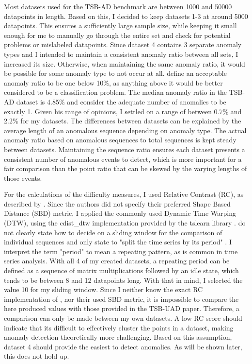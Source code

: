 \documentclass[12pt,oneside]{article}
\begin{document}
Most datasets used for the TSB-AD benchmark are between 1000 and 50000 datapoints in length. Based on this, I decided to keep datasets 1-3 at around 5000 datapoints. This ensures a sufficiently large sample size, while keeping it small enough for me to manually go through the entire set and check for potential problems or mislabeled datapoints. Since dataset 4 contains 3 separate anomaly types and I intended to maintain a consistent anomaly ratio between all sets, I increased its size. Otherwise, when maintaining the same anomaly ratio, it would be possible for some anomaly type to not occur at all. \cite[pp.~8]{SchmidlEtAl2022Anomaly} define an acceptable anomaly ratio to be one below 10\%, as anything above it would be better considered to be a classification problem. The median anomaly ratio in the TSB-AD dataset is 4.85\% and \cite[p.~4]{wu2021current} consider the adequate number of anomalies to be exactly 1. Given his range of opinions, I settled on a range of between 0.7\% and 2.2\% for my datasets. The differences between datasets can be explained by the average length of an anomalous sequence depending on anomaly type. The actual anomaly ratio based on anomalous sequences to total sequences is kept steady between datasets. Maintaining the sequence ratio ensures each dataset presents a consistent number of anomalous events to detect, which is more important for a fair comparison than the point ratio that can be skewed by the varying lengths of those events. \par
For the calculations of the difficulty measures, I used Relative Contrast (RC), as described by \cite[pp.~1704]{paparrizos2022tsb}. Since the authors did not specify their preferred Shape Based Distance (SBD) metric, I applied the commonly used Dynamic Time Warping (DTW), using the cdist\_dtw implementation provided by the tslearn library \parencites{DTW}. \cite[pp.~1704]{paparrizos2022tsb} do not clearly state how to decide on a sliding window for the comparison of individual sequences and only state to "split the time series by its period" \parencite[p.~1704]{paparrizos2022tsb}. I interpret the term "period" to mean a repeating pattern, as is common in time series analysis. With all 4 of my created datasets, a repeating period can be defined as a sequence of matrix multiplications followed by an idle state, which tends to be between 8 and 12 datapoints long. With that in mind, I selected the value 10 for my sliding window. Since I neither know the exact RC implementation of \cite{paparrizos2022tsb}, nor their used SBD metric, it is impossible to compare the here produced values with those provided in the TSB-UAD paper. Therefore, a comparison can only be made between my own datasets. A low RC score should indicate that its difficult to effectively cluster the points in a dataset, making anomaly detection theoretically more challenging. Based on this assumption, dataset 4 should provide the easiest to detect anomalies. As will be shown later, this does not hold up.
\end{document}
